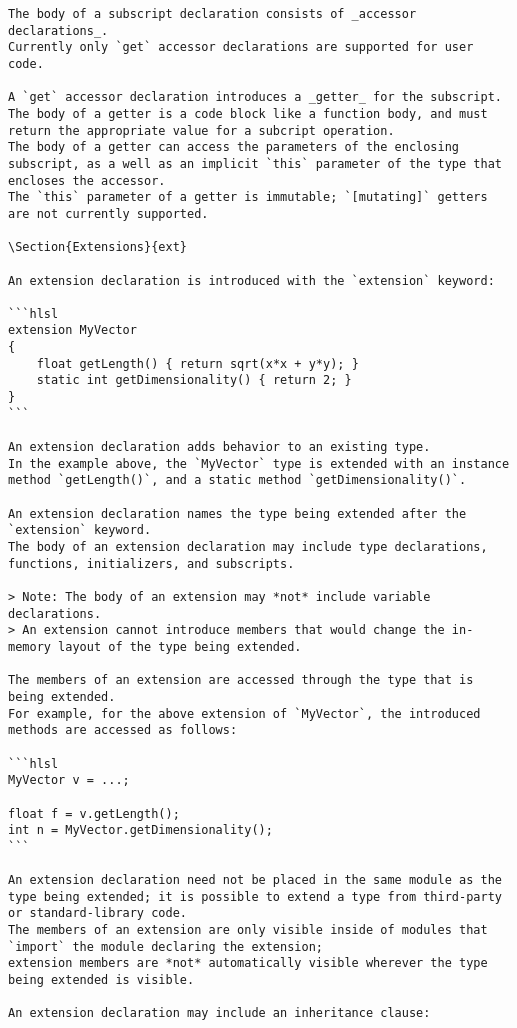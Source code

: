 \begin{verbatim}
The body of a subscript declaration consists of _accessor declarations_.
Currently only `get` accessor declarations are supported for user code.

A `get` accessor declaration introduces a _getter_ for the subscript.
The body of a getter is a code block like a function body, and must return the appropriate value for a subcript operation.
The body of a getter can access the parameters of the enclosing subscript, as a well as an implicit `this` parameter of the type that encloses the accessor.
The `this` parameter of a getter is immutable; `[mutating]` getters are not currently supported.

\Section{Extensions}{ext}

An extension declaration is introduced with the `extension` keyword:

```hlsl
extension MyVector
{
    float getLength() { return sqrt(x*x + y*y); }
    static int getDimensionality() { return 2; }
}
```

An extension declaration adds behavior to an existing type.
In the example above, the `MyVector` type is extended with an instance method `getLength()`, and a static method `getDimensionality()`.

An extension declaration names the type being extended after the `extension` keyword.
The body of an extension declaration may include type declarations, functions, initializers, and subscripts.

> Note: The body of an extension may *not* include variable declarations.
> An extension cannot introduce members that would change the in-memory layout of the type being extended.

The members of an extension are accessed through the type that is being extended.
For example, for the above extension of `MyVector`, the introduced methods are accessed as follows:

```hlsl
MyVector v = ...;

float f = v.getLength();
int n = MyVector.getDimensionality();
```

An extension declaration need not be placed in the same module as the type being extended; it is possible to extend a type from third-party or standard-library code.
The members of an extension are only visible inside of modules that `import` the module declaring the extension;
extension members are *not* automatically visible wherever the type being extended is visible.

An extension declaration may include an inheritance clause:


\end{verbatim}
